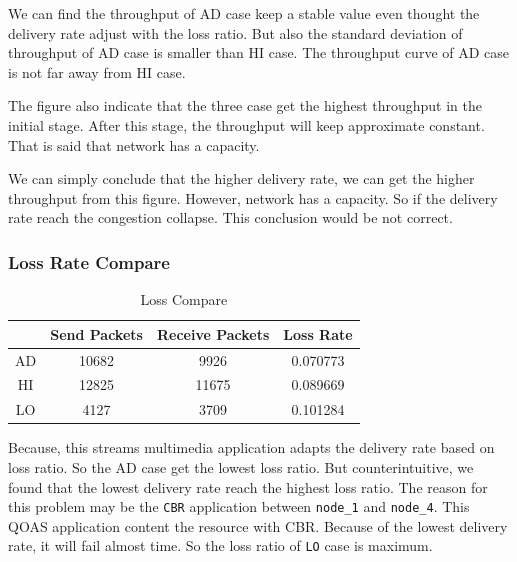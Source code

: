 We can find the throughput of AD case keep a stable value even thought the delivery rate adjust with the loss ratio. But also the standard deviation of throughput of AD case is smaller than HI case. The throughput curve of AD case is not far away from HI case. 

The figure also indicate that the three case get the highest throughput in the initial stage. After this stage, the throughput will keep approximate constant. That is said that network has a capacity. 

We can simply conclude that the higher delivery rate, we can get the higher throughput from this figure. However, network has a capacity. So if the delivery rate reach the congestion collapse. This conclusion would be not correct. 

\subsubsection{Loss Rate Compare}
\begin{table}[H]
    \centering
    \setlength{\extrarowheight}{2mm}
    \addtolength{\tabcolsep}{3mm}
    \begin{tabular}{c c c c}
        \hline \hline
        &  Send Packets & Receive Packets & Loss Rate \\
        \hline
        AD & 10682 & 9926 & 0.070773 \\
        HI & 12825 & 11675 & 0.089669 \\
        LO & 4127 & 3709 & 0.101284 \\
        \hline
    \end{tabular}
    \caption{Loss Compare}
\end{table}
Because, this streams multimedia application adapts the delivery rate based on loss ratio. So the AD case get the lowest loss ratio. But counterintuitive, we found that the lowest delivery rate reach the highest loss ratio. The reason for this problem may be the \verb|CBR| application between \verb|node_1| and \verb|node_4|. This QOAS application content the resource with CBR. Because of the lowest delivery rate, it will fail almost time. So the loss ratio of \verb|LO| case is maximum. 


